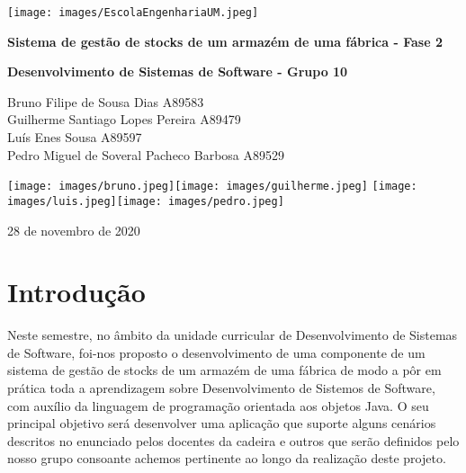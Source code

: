 \documentclass[11pt]{article}
\begin{document}
\begin{titlepage}
   \begin{center}
       
       \texttt{[image: images/EscolaEngenhariaUM.jpeg]}
       
       \vspace*{0.5cm}
       
       \textbf{\Large Sistema de gestão de stocks de um	armazém de uma fábrica - Fase 2}

       \vspace{1.3cm}
       \textbf{\large Desenvolvimento de Sistemas de Software - Grupo 10}
            
       \vspace{1.3cm}

       Bruno Filipe de Sousa Dias A89583\\ Guilherme Santiago Lopes Pereira A89479 \\ Luís Enes Sousa A89597\\ Pedro Miguel de Soveral Pacheco Barbosa A89529

       \vspace{1.5cm}
       
       \texttt{[image: images/bruno.jpeg]}\hspace{0.2cm}\texttt{[image: images/guilherme.jpeg]}
       \vspace{0.15cm}
       \hspace{0.1cm}\texttt{[image: images/luis.jpeg]}\hspace{0.1cm}\texttt{[image: images/pedro.jpeg]}
       
        
        28 de novembro de 2020
            
   \end{center}
\end{titlepage}

\tableofcontents
\thispagestyle{empty}
\cleardoublepage

\setcounter{page}{1}

\section{Introdução}

Neste semestre, no âmbito da unidade curricular de Desenvolvimento de Sistemas de Software, foi-nos proposto o desenvolvimento de uma componente de um sistema de gestão de stocks de um armazém de uma fábrica de modo a pôr em prática toda a aprendizagem sobre Desenvolvimento de Sistemos de Software, com auxílio da linguagem de programação orientada aos objetos Java. O seu principal objetivo será desenvolver uma aplicação que suporte alguns cenários descritos no enunciado pelos docentes da cadeira e outros que serão definidos pelo nosso grupo consoante achemos pertinente ao longo da realização deste projeto.
\end{document}
